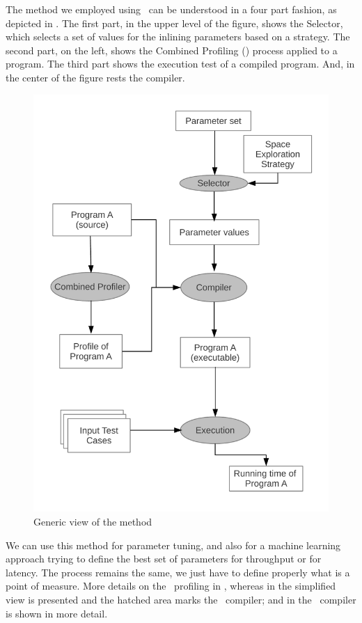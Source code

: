 
The method we employed using \CP\ can be understood in a four part
fashion, as depicted in . The first part, in
the upper level of the figure, shows the Selector, which selects a
set of values for the inlining parameters based on a strategy. The
second part, on the left, shows the Combined Profiling (\CP) process
applied to a program. The third part shows the execution test of a
compiled program. And, in the center of the figure rests the compiler.

\begin{figure}
  \centering
  \includegraphics[width=0.50\linewidth]{Figures/genView}
  \caption{Generic view of the method}
  \label{fig:genView}
\end{figure}

We can use this method for parameter tuning, and also for a machine
learning approach trying to define the best set of parameters for
throughput or for latency. The process remains the same, we just have
to define properly what is a point of measure. More details on the
\CP\ profiling in , whereas in 
the simplified view is presented and the hatched area marks the \CP\
compiler; and in  the \CP\ compiler is shown in
more detail.

